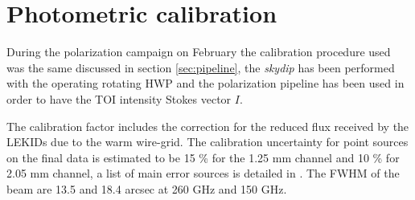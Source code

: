 \documentclass[twocolumn,traditabstract]{aa}
\begin{document}


\section{Photometric calibration}\label{calibration}
During the polarization campaign on February the calibration procedure used was
the same discussed in section \ref{sec:pipeline}, the \emph{skydip} has been
performed with the operating rotating HWP and the polarization pipeline has been
used in order to have the TOI intensity Stokes vector $I$.

The calibration factor includes the correction for the reduced flux received by
the LEKIDs due to the warm wire-grid. The calibration uncertainty for point
sources on the final data is estimated to be 15 \% for the 1.25 mm channel and
10 \% for 2.05 mm channel, a list of main error sources is detailed in
\citep{catalano2014}. The FWHM of the beam are 13.5 and 18.4 arcsec at 260 GHz
and 150 GHz.
\end{document}
